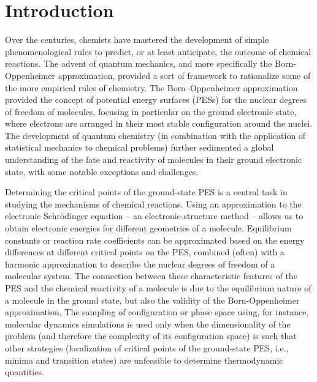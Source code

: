 \documentclass[9pt,bestpractices,pubversion]{livecoms}
\begin{document}
\tableofcontents


\section{Introduction}

Over the centuries, chemists have mastered the development of simple phenomenological rules to predict, or at least anticipate, the outcome of chemical reactions. The advent of quantum mechanics, and more specifically the Born-Oppenheimer approximation, provided a sort of framework to rationalize some of the more empirical rules of chemistry. The Born--Oppenheimer approximation provided the concept of potential energy surfaces (PESs) for the nuclear degrees of freedom of molecules, focusing in particular on the ground electronic state, where electrons are arranged in their most stable configuration around the nuclei. The development of quantum chemistry (in combination with the application of statistical mechanics to chemical problems) further sedimented a global understanding of the fate and reactivity of molecules in their ground electronic state, with some notable exceptions and challenges.\cite{carpenter2005nonstatistical,tantillo2021beyond} 

Determining the critical points of the ground-state PES is a central task in studying the mechanisms of chemical reactions. Using an approximation to the electronic Schr\"{o}dinger equation -- an electronic-structure method -- allows us to obtain electronic energies for different geometries of a molecule. Equilibrium constants or reaction rate coefficients can be approximated based on the energy differences at different critical points on the PES, combined (often) with a harmonic approximation to describe the nuclear degrees of freedom of a molecular system. The connection between these characteristic features of the PES and the chemical reactivity of a molecule is due to the equilibrium nature of a molecule in the ground state, but also the validity of the Born-Oppenheimer approximation. The sampling of configuration or phase space using, for instance, molecular dynamics simulations is used only when the dimensionality of the problem (and therefore the complexity of its configuration space) is such that other strategies (localization of critical points of the ground-state PES, i.e., minima and transition states) are unfeasible to determine thermodynamic quantities.
\end{document}
